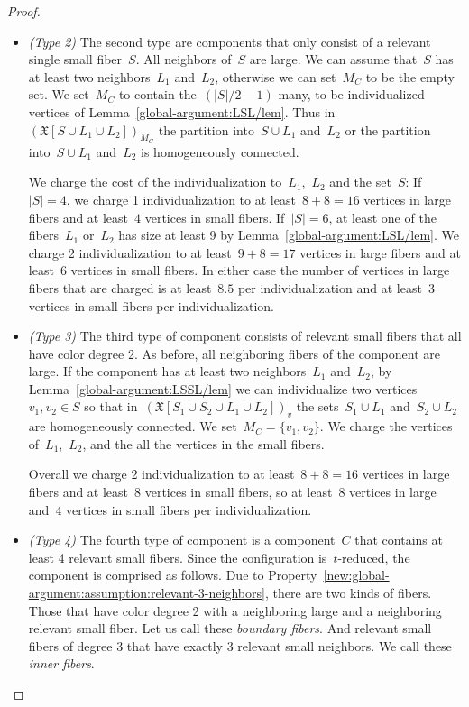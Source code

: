 \documentclass[english,a4paper]{article}
\theoremstyle{plain}
\theoremstyle{definition}
\newcommand{\coherentConfig}{\ensuremath{\mathfrak{X}}}
\begin{document}
\begin{proof}
\begin{itemize}
        \item \emph{(Type 2)}
        The second type are components that only consist of a relevant single small fiber~$S$. All neighbors of~$S$ are large. We can assume that~$S$ has at least two neighbors~$L_1$ and~$L_2$, otherwise we can set~$M_C$ to be the empty set.
        We set~$M_C$ to contain the~$(|S|/2 -1)$-many, to be individualized vertices of Lemma~\ref{global-argument:LSL/lem}.
        Thus in~$(\coherentConfig[S\cup L_1\cup L_2])_{M_C}$ the partition into~$S\cup L_1$ and~$L_2$ or the partition into~$S\cup L_1$ and~$L_2$ is homogeneously connected.

        We charge the cost of the individualization to~$L_1$,~$L_2$ and the set~$S$:
        If~$|S|=4$, we charge 1 individualization to at least~$8+8=16$ vertices in large fibers and at least~$4$ vertices in small fibers.
        If~$|S|=6$, at least one of the fibers~$L_1$ or~$L_2$ has size at least 9 by Lemma~\ref{global-argument:LSL/lem}. We charge 2 individualization to at least~$9+8=17$ vertices in large fibers and at least~$6$ vertices in small fibers.
        In either case the number of vertices in large fibers that are charged is at least~$8.5$ per individualization and at least~$3$ vertices in small fibers per individualization.

        \item \emph{(Type 3)}
        The third type of component consists of relevant small fibers that all have color degree 2.
        As before, all neighboring fibers of the component are large. If the component has at least two neighbors~$L_1$ and~$L_2$, by Lemma~\ref{global-argument:LSSL/lem}  we can individualize two vertices~$v_1,v_2\in S$ so that in~$(\coherentConfig[S_1\cup S_2\cup L_1\cup L_2])_v$
        the sets~$S_1\cup L_1$ and~$S_2\cup L_2$ are homogeneously connected. We set~$M_C=\{v_1,v_2\}$. We charge the vertices of~$L_1$,~$L_2$, and the all the vertices in the small fibers.

        Overall we charge 2 individualization to at least~$8+8=16$ vertices in large fibers and at least~$8$ vertices in small fibers, so at least~$8$ vertices in large and~$4$ vertices in small fibers per individualization.

        \item \emph{(Type 4)}
        The fourth type of component is a component~$C$ that contains at least 4 relevant small fibers.
        Since the configuration is~$t$-reduced,
        the component is comprised as follows. Due to Property~\ref{new:global-argument:assumption:relevant-3-neighbors}, there are two kinds of fibers. Those that have color degree 2 with a neighboring large and a neighboring relevant small fiber. Let us call these \emph{boundary fibers}.
        And relevant small fibers of degree 3 that have exactly 3 relevant small neighbors. We call these \emph{inner fibers}.


\end{itemize}
\end{proof}
\end{document}

